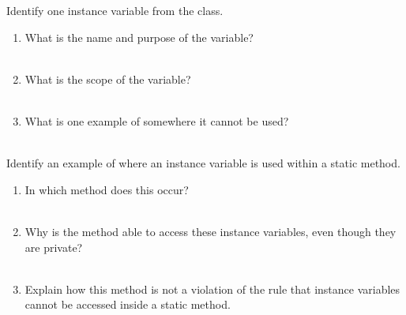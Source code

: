 \Q Identify one instance variable from the  class.
\begin{enumerate}
\item What is the name and purpose of the variable?
\\  \\[-2em]

\item What is the scope of the variable?
\\  \\[-2em]

\item What is one example of somewhere it cannot be used?
\\  \\[-2em]
\end{enumerate}


\newpage

\Q Identify an example of where an instance variable is used within a static method.
\begin{enumerate}
\item In which method does this occur? \\[2pt]
 \\[-2em]

\item Why is the method able to access these instance variables, even though they are private? \\[2pt]
 \\[-2em]

\item Explain how this method is not a violation of the rule that instance variables cannot be accessed inside a static method. \\[1ex]
 \\[-2em]
\end{enumerate}


